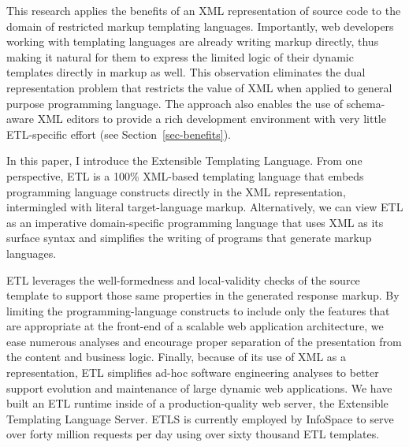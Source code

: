 \documentclass{www2003-submission}
\newcommand{\secref}[1]{Section~\ref{sec-#1}}
\begin{document}
This research applies the benefits of an XML representation of source
code to the domain of restricted markup templating languages.
Importantly, web developers working with templating languages are
already writing markup directly, thus making it natural for them to
express the limited logic of their dynamic templates directly in
markup as well.  This observation eliminates the dual representation
problem that restricts the value of XML when applied to general
purpose programming language.  The approach also enables the use of
schema-aware XML editors to provide a rich development environment
with very little ETL-specific effort (see \secref{benefits}).

In this paper, I introduce the Extensible Templating Language.  From
one perspective, ETL is a 100\% XML-based templating language that
embeds programming language constructs directly in the XML
representation, intermingled with literal target-language markup.
Alternatively, we can view ETL as an imperative domain-specific
programming language that uses XML as its surface syntax and
simplifies the writing of programs that generate markup languages.

ETL leverages the well-formedness and local-validity checks of the
source template to support those same properties in the generated
response markup.  By limiting the programming-language constructs to
include only the features that are appropriate at the front-end of a
scalable web application architecture, we ease numerous analyses and
encourage proper separation of the presentation from the content and
business logic. Finally, because of its use of XML as a
representation, ETL simplifies ad-hoc software engineering analyses to
better support evolution and maintenance of large dynamic web
applications.  We have built an ETL runtime inside of a
production-quality web server, the Extensible Templating Language
Server.  ETLS is currently employed by InfoSpace to serve over forty
million requests per day using over sixty thousand ETL templates.
\end{document}
